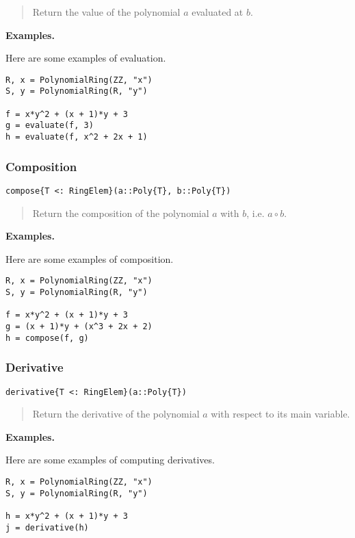 \documentclass[a4paper,10pt]{article}
\newcommand{\desc}[1]{\vspace{-3mm}\begin{quote}#1\end{quote}}
\begin{document}
\desc{Return the value of the polynomial $a$ evaluated at $b$.}

\textbf{Examples.}

Here are some examples of evaluation.

\begin{lstlisting}
R, x = PolynomialRing(ZZ, "x")
S, y = PolynomialRing(R, "y")

f = x*y^2 + (x + 1)*y + 3
g = evaluate(f, 3)
h = evaluate(f, x^2 + 2x + 1)
\end{lstlisting}

\subsubsection{Composition}

\begin{lstlisting}
compose{T <: RingElem}(a::Poly{T}, b::Poly{T})
\end{lstlisting}

\desc{Return the composition of the polynomial $a$ with $b$, i.e. $a \circ b$.}

\textbf{Examples.}

Here are some examples of composition.

\begin{lstlisting}
R, x = PolynomialRing(ZZ, "x")
S, y = PolynomialRing(R, "y")

f = x*y^2 + (x + 1)*y + 3
g = (x + 1)*y + (x^3 + 2x + 2)
h = compose(f, g)
\end{lstlisting}

\subsubsection{Derivative}

\begin{lstlisting}
derivative{T <: RingElem}(a::Poly{T})
\end{lstlisting}

\desc{Return the derivative of the polynomial $a$ with respect to its main
variable.}

\textbf{Examples.}

Here are some examples of computing derivatives.

\begin{lstlisting}
R, x = PolynomialRing(ZZ, "x")
S, y = PolynomialRing(R, "y")

h = x*y^2 + (x + 1)*y + 3
j = derivative(h)
\end{lstlisting}
\end{document}
